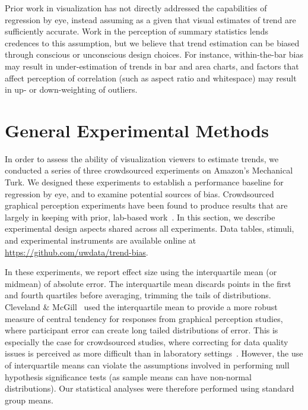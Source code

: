 \documentclass{sigchi}
\begin{document}
Prior work in visualization has not directly addressed the capabilities of regression by eye, instead assuming as a given that visual estimates of trend are sufficiently accurate. Work in the perception of summary statistics lends credences to this assumption, but we believe that trend estimation can be biased through conscious or unconscious design choices. For instance, within-the-bar bias may result in under-estimation of trends in bar and area charts, and factors that affect perception of correlation (such as aspect ratio and whitespace) may result in up- or down-weighting of outliers.

\section{General Experimental Methods}

\expFig

In order to assess the ability of visualization viewers to estimate trends, we conducted a series of three crowdsourced experiments on Amazon's Mechanical Turk. We designed these experiments to establish a performance baseline for regression by eye, and to examine potential sources of bias. Crowdsourced graphical perception experiments have been found to produce results that are largely in keeping with prior, lab-based work~\cite{heer2010crowdsourcing, talbot2014four}. In this section, we describe experimental design aspects shared across all experiments. Data tables, stimuli, and experimental instruments are available online at \url{https://github.com/uwdata/trend-bias}.

In these experiments, we report effect size using the interquartile mean (or midmean) of absolute error. The interquartile mean discards points in the first and fourth quartiles before averaging, trimming the tails of distributions. Cleveland \& McGill~\cite{cleveland1984graphical} used the interquartile mean to provide a more robust measure of central tendency for responses from graphical perception studies, where participant error can create long tailed distributions of error. This is especially the case for crowdsourced studies, where correcting for data quality issues is perceived as more difficult than in laboratory settings~\cite{heer2010crowdsourcing}. However, the use of interquartile means can violate the assumptions involved in performing null hypothesis significance tests (as sample means can have non-normal distributions). Our statistical analyses were therefore performed using standard group means.
\end{document}
